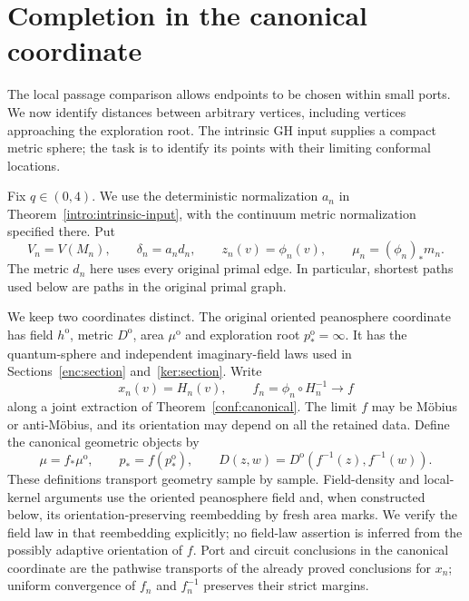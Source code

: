 \section{Completion in the canonical coordinate}
\label{comp:section}

The local passage comparison allows endpoints to be chosen within
small ports.  We now identify distances between arbitrary vertices,
including vertices approaching the exploration root.  The intrinsic
GH input supplies a compact metric sphere; the task is to identify
its points with their limiting conformal locations.

Fix $q\in(0,4)$.  We use the deterministic normalization $a_n$ in
Theorem~\ref{intro:intrinsic-input}, with the continuum metric
normalization specified there.  Put
\[
 V_n=V(M_n),\qquad \delta_n=a_n d_n,
 \qquad z_n(v)=\phi_n(v),\qquad
 \mu_n=(\phi_n)_*m_n.
\]
The metric $d_n$ here uses every original primal edge.  In particular,
shortest paths used below are paths in the original primal graph.

We keep two coordinates distinct.  The original oriented peanosphere
coordinate has field $h^{\mathrm o}$, metric $D^{\mathrm o}$, area
$\mu^{\mathrm o}$ and exploration root $p_*^{\mathrm o}=\infty$.
It has the quantum-sphere and independent imaginary-field laws used
in Sections~\ref{enc:section} and~\ref{ker:section}.  Write
\[
 x_n(v)=H_n(v),\qquad
 f_n=\phi_n\circ H_n^{-1}\longrightarrow f
\]
along a joint extraction of Theorem~\ref{conf:canonical}.  The limit
$f$ may be M\"obius or anti-M\"obius, and its orientation may depend
on all the retained data.  Define the canonical geometric objects by
\begin{equation}
 \label{comp:two-coordinates}
 \mu=f_*\mu^{\mathrm o},\qquad p_*=f(p_*^{\mathrm o}),\qquad
 D(z,w)=D^{\mathrm o}(f^{-1}(z),f^{-1}(w)).
\end{equation}
These definitions transport geometry sample by sample.  Field-density
and local-kernel arguments use the oriented peanosphere field and,
when constructed below, its orientation-preserving reembedding by
fresh area marks.  We verify the field law in that reembedding
explicitly; no field-law assertion is inferred from the possibly
adaptive orientation of $f$.  Port and circuit conclusions in the
canonical coordinate are the
pathwise transports of the already proved conclusions for $x_n$;
uniform convergence of $f_n$ and $f_n^{-1}$ preserves their strict
margins.

